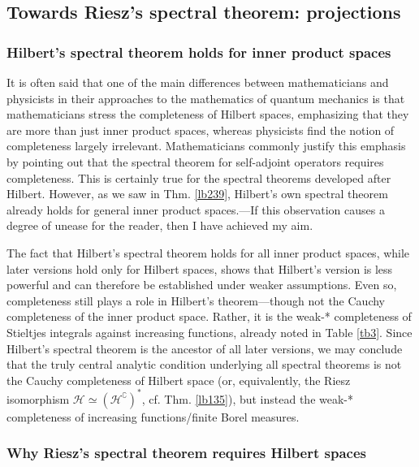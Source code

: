 \documentclass[12pt,b5paper,notitlepage]{article}
\theoremstyle{definition}
\theoremstyle{plain}
\newcommand{\mc}{\mathcal}
\newcommand{\Co}{\complement}
\numberwithin{equation}{section}
\begin{document}
\subsection{Towards Riesz's spectral theorem: projections}


\subsubsection{Hilbert's spectral theorem holds for inner product spaces}


It is often said that one of the main differences between mathematicians and physicists in their approaches to the mathematics of quantum mechanics is that mathematicians stress the completeness of Hilbert spaces, emphasizing that they are more than just inner product spaces, whereas physicists find the notion of completeness largely irrelevant. Mathematicians commonly justify this emphasis by pointing out that the spectral theorem for self-adjoint operators requires completeness. This is certainly true for the spectral theorems developed after Hilbert. However, as we saw in Thm. \ref{lb239}, Hilbert's own spectral theorem already holds for general inner product spaces.---If this observation causes a degree of unease for the reader, then I have achieved my aim.




The fact that Hilbert's spectral theorem holds for all inner product spaces, while later versions hold only for Hilbert spaces, shows that Hilbert's version is less powerful and can therefore be established under weaker assumptions. Even so, completeness still plays a role in Hilbert's theorem---though not the Cauchy completeness of the inner product space. Rather, it is the weak-* completeness of Stieltjes integrals against increasing functions, already noted in Table \ref{tb3}. Since Hilbert's spectral theorem is the ancestor of all later versions, we may conclude that the truly central analytic condition underlying all spectral theorems is not the Cauchy completeness of Hilbert space (or, equivalently, the Riesz isomorphism $\mc H\simeq (\mc H^\Co)^*$, cf. Thm. \ref{lb135}), but instead the weak-* completeness of increasing functions/finite Borel measures.





\subsubsection{Why Riesz’s spectral theorem requires Hilbert spaces}
\end{document}
